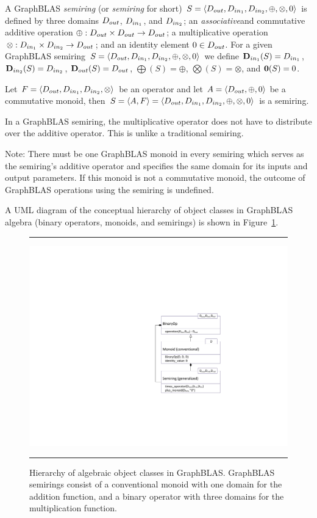 A GraphBLAS \emph{semiring} (or \emph{semiring} for short)
$S=\langle \mbox{$D_{out}$}, \mbox{$D_{in_{1}}$}, \mbox{$D_{in_{2}}$}, \oplus, \otimes, 0 \rangle$ is defined by
three domains $\mbox{$D_{out}$}$, $\mbox{$D_{in_{1}}$}$, and $\mbox{$D_{in_{2}}$}$; an \emph{associative}\footnotemark[\value{footnote}]
and commutative
additive operation $\oplus : \mbox{$D_{out}$} \times \mbox{$D_{out}$} \rightarrow \mbox{$D_{out}$}$; 
a multiplicative operation $\otimes : \mbox{$D_{in_{1}}$} \times \mbox{$D_{in_{2}}$} \rightarrow
\mbox{$D_{out}$}$; and an identity element $0 \in \mbox{$D_{out}$}$.
For a given GraphBLAS semiring $S=\langle \mbox{$D_{out}$}, \mbox{$D_{in_{1}}$},
\mbox{$D_{in_{2}}$}, \oplus,\otimes,0 \rangle$ we define $\mbox{$\mathbf{D}_{in_{1}}$}(S) = \mbox{$D_{in_{1}}$}$,
$\mbox{$\mathbf{D}_{in_{2}}$}(S) = \mbox{$D_{in_{2}}$}$, $\mbox{$\mathbf{D}_{out}$}(S) = \mbox{$D_{out}$}$, $\mathbf{\bigoplus}(S) =
\oplus$, $\mathbf{\bigotimes}(S) = \otimes$, and ${\bf 0}(S) = 0$. 

Let $F = \langle \mbox{$D_{out}$},\mbox{$D_{in_{1}}$},\mbox{$D_{in_{2}}$},\otimes \rangle$ be an operator
and let $A = \langle \mbox{$D_{out}$},\oplus,0 \rangle$ be a commutative monoid,
then $S= \langle A,F \rangle = \langle \mbox{$D_{out}$},\mbox{$D_{in_{1}}$},\mbox{$D_{in_{2}}$},\oplus,\otimes,0 \rangle$
is a semiring.

In a GraphBLAS semiring, the multiplicative operator does not have to distribute over the additive operator. 
This is unlike a traditional semiring.

Note: There must be one GraphBLAS monoid in every semiring which 
serves as the semiring's additive operator and  
specifies the same domain for its inputs and output parameters. 
If this monoid is not a commutative monoid, the outcome of GraphBLAS
operations using the semiring is undefined.

A UML diagram of the conceptual hierarchy of object classes in GraphBLAS
algebra (binary operators, monoids, and semirings) is shown in 
Figure~\ref{Fig:AlgebraHierarchy}.

\begin{figure}[htb]
    \hrule
    \begin{center}
        \includegraphics[width=1.0\linewidth,trim=3in 2in 0.5in 2in]{Algebra_Hierarchy_v2_1.pdf}
    \end{center}
    \caption{Hierarchy of algebraic object classes in GraphBLAS. GraphBLAS 
    semirings consist of a conventional monoid with one domain for the addition 
    function, and a binary operator with three domains for the multiplication function.}
    \label{Fig:AlgebraHierarchy}
    \hrule
\end{figure}

